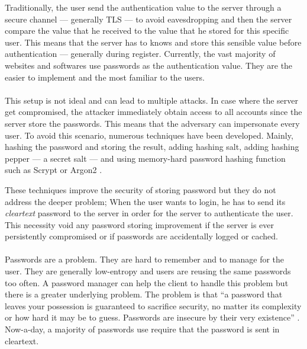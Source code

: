 \documentclass[../report.tex]{subfiles}
\begin{document}
Traditionally, the user send the authentication value to the server through a secure channel --- generally TLS --- to avoid eavesdropping and then the server compare the value that he received to the value that he stored for this specific user.
This means that the server has to knows and store this sensible value before authentication --- generally during register.
Currently, the vast majority of websites and softwares use passwords as the authentication value. They are the easier to implement and the most familiar to the users.



\paragraph{}
This setup is not ideal and can lead to multiple attacks.
In case where the server get compromised, the attacker immediately obtain access to all accounts since the server store the passwords. This means that the adversary can impersonate every user.
To avoid this scenario, numerous techniques have been developed.
Mainly, hashing the password and storing the result, adding hashing salt, adding hashing pepper --- a secret salt --- and using memory-hard password hashing function such as Scrypt \cite{Scrypt_Paper} or Argon2 \cite{Argon2_Paper}.


These techniques improve the security of storing password but they do not address the deeper problem;
When the user wants to login, he has to send its \emph{cleartext} password to the server in order for the server to authenticate the user. This necessity void any password storing improvement if the server is ever persistently compromised or if passwords are accidentally logged or cached.


\paragraph{}
Passwords are a problem. They are hard to remember and to manage for the user. They are generally low-entropy and users are reusing the same passwords too often. A password manager can help the client to handle this problem but there is a greater underlying problem.
The problem is that ``a password that leaves your possession is guaranteed to sacrifice security, no matter its complexity or how hard it may be to guess. Passwords are insecure by their very existence'' \cite{PAKE_Cloudflare_blog}. %
Now-a-day, a majority of passwords use require that the password is sent in cleartext.
\end{document}
